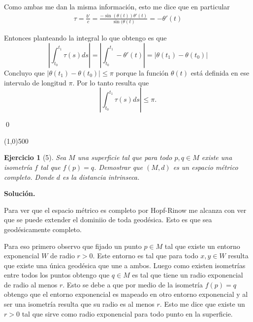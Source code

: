 \documentclass{article}
\theoremstyle{plain} %
\newtheorem*{ej}{Ejercicio}
\theoremstyle{definition}
\begin{document}
	Como ambas me dan la misma información, esto me dice que en particular 
	\begin{align*}
	\tau = \frac{b'}{c} = \frac{-\sin(\theta(t))\theta'(t)}{\sin(\theta(t)} = -\theta'(t)
	\end{align*}
	
	Entonces planteando la integral lo que obtengo es que 
	\begin{equation*}
	|\int_{t_0}^{t_1} \tau(s) ds| = |\int_{t_0}^{t_1}-\theta'(t)| = |\theta(t_1) - \theta(t_0)|
	\end{equation*} 
	Concluyo que $|\theta(t_1) - \theta(t_0)| \leq \pi$ porque la función $\theta(t)$ está definida en ese intervalo de longitud $\pi$. Por lo tanto resulta que 
	\begin{equation*}
	|\int_{t_0}^{t_1} \tau(s) ds| \leq \pi.
	\end{equation*} 
	
	\qed
	
	\line(1,0){500}
	
	\bigskip
	


	\begin{ej}[5]
	Sea $M$ una superficie tal que para todo $p,q \in M$ existe una isometría $f$ tal que $f(p)=q$. Demostrar que $(M,d)$ es un espacio métrico completo. Donde $d$ es la distancia intrinseca.
	\end{ej}
	
	\textbf{Solución.}
	
	Para ver que el espacio métrico es completo por Hopf-Rinow me alcanza con ver que se puede extender el dominiio de toda geodésica. Esto es que sea geodésicamente completo.
	
	Para eso primero observo que fijado un punto $p \in M$ tal que existe un entorno exponencial $W$ de radio $r>0$. Este entorno es tal que para todo $x,y \in W$ resulta que existe una única geodésica que une a ambos. Luego como existen isometrías entre todos los puntos obtengo que $q \in M$ es tal que tiene un radio exponencial de radio al menos $r$. Esto se debe a que por medio de la isometría $f(p)=q$ obtengo que el entorno exponencial es mapeado en otro entorno exponencial y al ser una isometría resulta que su radio es al menos $r$. Esto me dice que existe un $r>0$ tal que sirve como radio exponencial para todo punto en la superficie.
	
\end{document}
